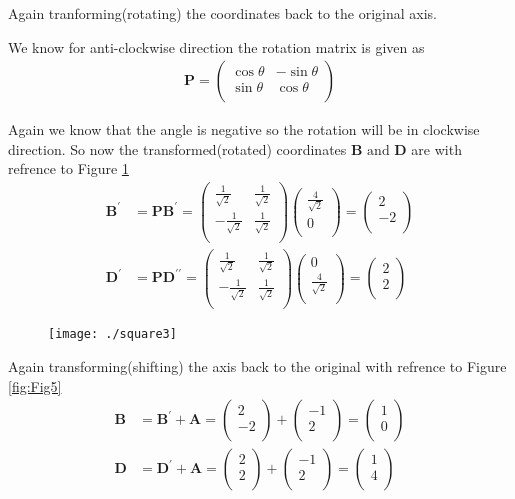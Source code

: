 \documentclass[12pt]{article}
\newcommand{\myvec}[1]{\ensuremath{\begin{pmatrix}#1\end{pmatrix}}}
\let\vec\mathbf
\begin{document}
\newpage
Again tranforming(rotating) the coordinates back to the original axis.

We know for anti-clockwise direction the rotation matrix is given as
\begin{align}
\vec{P} =
\myvec{
\cos\theta & -\sin\theta \\
\sin\theta & \cos\theta \\
}
\end{align}

Again we know that the angle is negative so the rotation will be in clockwise direction. So now the transformed(rotated) coordinates $\vec{B} \text{ and } \vec{D}$ are with refrence to Figure \ref{fig:Fig4}
\begin{align}
\vec{B^{\prime}} &= \vec{P}\vec{B^{\prime}} = \myvec{
\frac{1}{\sqrt{2}} & \frac{1}{\sqrt{2}} \\
-\frac{1}{\sqrt{2}} & \frac{1}{\sqrt{2}}\\
}
\myvec{
 \frac{4}{\sqrt{2}}\\
 0\\
} = 
\myvec{
2 \\
-2\\
}\\
\vec{D^{\prime}} &= \vec{P}\vec{D^{\prime \prime}} = \myvec{
\frac{1}{\sqrt{2}} & \frac{1}{\sqrt{2}} \\
-\frac{1}{\sqrt{2}} & \frac{1}{\sqrt{2}}\\
}
\myvec{
 0\\
 \frac{4}{\sqrt{2}}\\
} = 
\myvec{
2 \\
2 \\
}
\end{align}

\begin{figure}[!h]
	\begin{center} 
	    \texttt{[image: ./square3]}
	\end{center}
\caption{}
\label{fig:Fig4}
\end{figure}

Again transforming(shifting) the axis back to the original with refrence to Figure \ref{fig:Fig5}
\begin{align}
\vec{B} &= \vec{B^{\prime}}+\vec{A} = \myvec{
2 \\
-2\\
}+\myvec{
-1 \\
2\\
} = 
\myvec{
1 \\
0\\
}\\
\vec{D} &= \vec{D^{\prime}}+\vec{A} = \myvec{
2 \\
2\\
}+\myvec{
-1 \\
2\\
} = 
\myvec{
1 \\
4 \\
}
\end{align}
\end{document}
